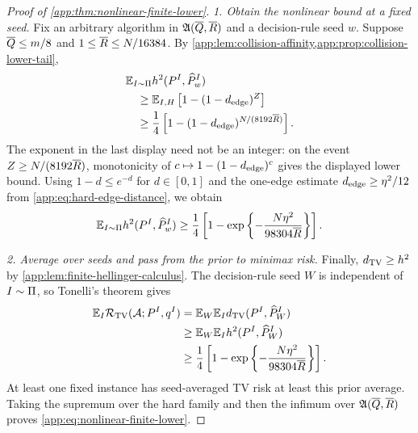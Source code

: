\begin{proof}[Proof of \cref{app:thm:nonlinear-finite-lower}]

\emph{1. Obtain the nonlinear bound at a fixed seed.}
Fix an arbitrary algorithm in \(\HardAlgorithmClass{\QueryBudget{}}{\RoundBudget{}}\) and a decision-rule
seed \(w\). Suppose \(\QueryBudget{}\le\HardBankSize/8\) and
\(1\le \RoundBudget{}\le N/16384\). By
\cref{app:lem:collision-affinity,app:prop:collision-lower-tail},
\begin{align}
 &\mathbb E_{I\sim\HardInstancePrior}
 \sqHellinger(\HardTargetLaw{I},\HardOutputLaw{I}{w})\notag\\
 &\quad\ge
 \mathbb E_{I,H}
 \left[1-(1-\HardEdgeDistance)^{\TotalCollisions}\right]\notag\\
 &\quad\ge
 \frac14\left[
  1-(1-\HardEdgeDistance)^{N/(8192\RoundBudget{})}
 \right].
 \label{app:eq:nonlinear-fixed-seed-step}
\end{align}
The exponent in the last display need not be an integer: on the event
\(\TotalCollisions\ge N/(8192\RoundBudget{})\), monotonicity of
\(c\mapsto1-(1-\HardEdgeDistance)^c\) gives the displayed lower bound.
Using \(1-d\le e^{-d}\) for \(d\in[0,1]\) and the one-edge estimate
\(\HardEdgeDistance\ge\EdgeCoupling^2/12\) from
\eqref{app:eq:hard-edge-distance}, we obtain
\begin{equation}
 \mathbb E_{I\sim\HardInstancePrior}
 \sqHellinger(\HardTargetLaw{I},\HardOutputLaw{I}{w})
 \ge
 \frac14\left[
  1-\exp\left\{-\frac{N\EdgeCoupling^2}{98304\RoundBudget{}}\right\}
 \right].
 \label{app:eq:nonlinear-fixed-seed-lower}
\end{equation}


\emph{2. Average over seeds and pass from the prior to minimax risk.}
Finally, \(\dTV\ge\sqHellinger\) by
\cref{app:lem:finite-hellinger-calculus}. The decision-rule seed \(W\) is
independent of \(I\sim\HardInstancePrior\), so Tonelli's theorem gives
\begin{align}
 \mathbb E_I\SeedRisk(\mathcal A;\HardTargetLaw{I},\HardOracle{I})
 &=\mathbb E_W\mathbb E_I
    \dTV(\HardTargetLaw{I},\HardOutputLaw{I}{W})\notag\\
 &\ge\mathbb E_W\mathbb E_I
    \sqHellinger(\HardTargetLaw{I},\HardOutputLaw{I}{W})\notag\\
 &\ge\frac14\left[
  1-\exp\left\{-\frac{N\EdgeCoupling^2}{98304\RoundBudget{}}\right\}
 \right].
 \label{app:eq:prior-to-seed-risk}
\end{align}
At least one fixed instance has seed-averaged TV risk at least this
prior average. Taking the supremum over the hard family and then the
infimum over \(\HardAlgorithmClass{\QueryBudget{}}{\RoundBudget{}}\)
proves \eqref{app:eq:nonlinear-finite-lower}.
\end{proof}

